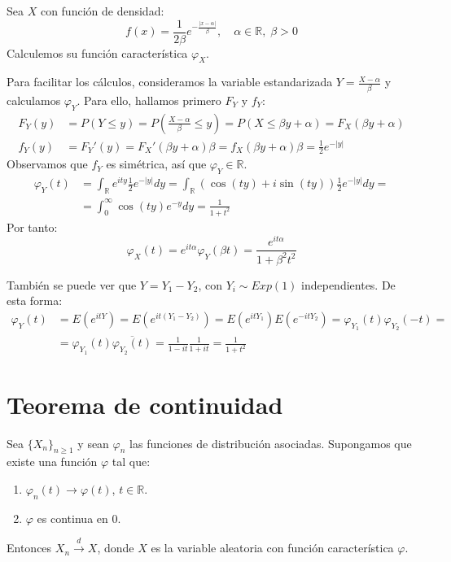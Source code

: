 \begin{exercise}
    Sea $X$ con función de densidad:
    $$f(x) = \frac{1}{2\beta}e^{-\frac{|x-\alpha|}{\beta}}, \quad \alpha \in \mathbb{R}, \; \beta > 0$$
    Calculemos su función característica $\varphi_X$.

    Para facilitar los cálculos, consideramos la variable estandarizada $Y = \frac{X-\alpha}{\beta}$ y calculamos $\varphi_Y$.
    Para ello, hallamos primero $F_Y$ y $f_Y$:
    \begin{align*}
        F_Y(y) & = P(Y \leq y) = P\left(\frac{X-\alpha}{\beta} \leq y\right) = P(X \leq \beta y + \alpha) = F_X(\beta y + \alpha) \\
        f_Y(y) & = F_Y'(y) = F_X'(\beta y + \alpha)\beta = f_X(\beta y + \alpha)\beta = \frac{1}{2}e^{-|y|}
    \end{align*}
    Observamos que $f_Y$ es simétrica, así que $\varphi_Y \in \mathbb{R}$.
    \begin{align*}
        \varphi_Y(t) & = \int_\mathbb{R} e^{ity}\frac{1}{2}e^{-|y|}dy = \int_\mathbb{R} (\cos(ty) + i\sin(ty))\frac{1}{2}e^{-|y|}dy = \\
                     & = \int_0^\infty \cos(ty)e^{-y}dy = \frac{1}{1+t^2}
    \end{align*}
    Por tanto:
    $$\varphi_X(t) = e^{it\alpha}\varphi_Y(\beta t) = \frac{e^{it\alpha}}{1+\beta^2t^2}$$

    También se puede ver que $Y = Y_1 - Y_2$, con $Y_i \sim Exp(1)$ independientes.
    De esta forma:
    \begin{align*}
        \varphi_Y(t) & = E(e^{itY}) = E(e^{it(Y_1-Y_2)}) = E(e^{itY_1})E(e^{-itY_2}) = \varphi_{Y_1}(t)\varphi_{Y_2}(-t) = \\
                     & = \varphi_{Y_1}(t) \overline{\varphi_{Y_2}(t)} = \frac{1}{1-it}\frac{1}{1+it} = \frac{1}{1+t^2}
    \end{align*}
\end{exercise}

\section{Teorema de continuidad}
\begin{theorem}
    Sea $\{X_n\}_{n \geq 1}$ y sean $\varphi_n$ las funciones de distribución asociadas.
    Supongamos que existe una función $\varphi$ tal que:
    \begin{enumerate}
        \item $\varphi_n(t) \to \varphi(t)$, $t \in \mathbb{R}$.
        \item $\varphi$ es continua en 0.
    \end{enumerate}
    Entonces $X_n \xrightarrow{d} X$, donde $X$ es la variable aleatoria con función característica $\varphi$.
\end{theorem}

